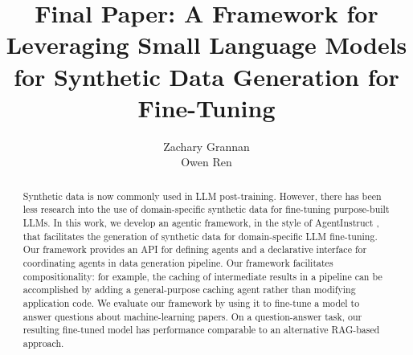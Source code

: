 \documentclass{article}
\title{Final Paper: A Framework for Leveraging Small Language Models for Synthetic Data Generation for
Fine-Tuning}
\author{%
  Zachary Grannan \\
  \And{}
  Owen Ren
}
\begin{document}
\maketitle

\begin{abstract}
Synthetic data is now commonly used in LLM post-training. However, there has
been less research into the use of domain-specific synthetic data for
fine-tuning purpose-built LLMs. In this work, we develop an agentic framework,
in the style of AgentInstruct \citep{mitra_agentinstruct_2024}, that facilitates
the generation of synthetic data for domain-specific LLM fine-tuning. Our
framework provides an API for defining agents and a declarative interface for
coordinating agents in data generation pipeline. Our framework facilitates
compositionality: for example, the caching of intermediate results in a pipeline
can be accomplished by adding a general-purpose caching agent rather than
modifying application code.  We evaluate our framework by using it to fine-tune
a model to answer questions about machine-learning papers. On a question-answer
task, our resulting fine-tuned model has performance comparable to an
alternative RAG-based approach.
\end{abstract}











\clearpage



\end{document}
